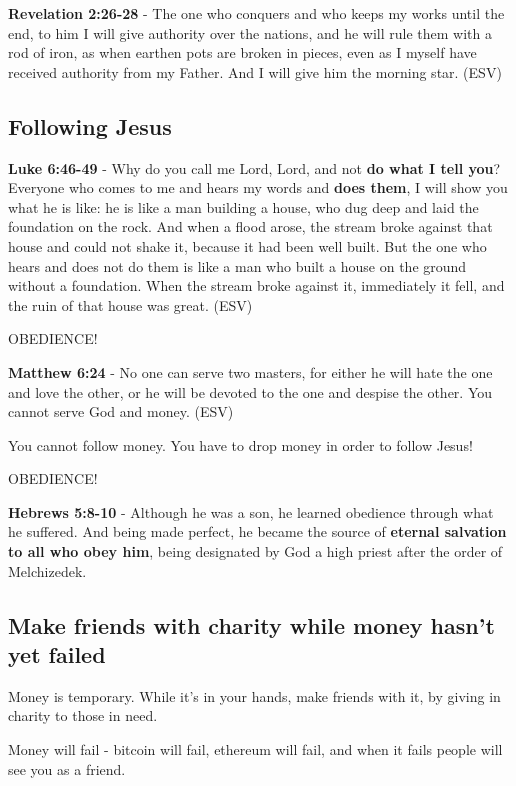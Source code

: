 \documentclass[11pt]{article}
\begin{document}
\textbf{Revelation 2:26-28} - The one who conquers and who keeps my works until the end, to him I will give authority over the nations, and he will rule them with a rod of iron, as when earthen pots are broken in pieces, even as I myself have received authority from my Father. And I will give him the morning star. (ESV)

\subsection{Following Jesus}
\label{sec:org641cdb5}
\textbf{Luke 6:46-49} - Why do you call me Lord, Lord, and not \textbf{do what I tell you}? Everyone who comes to me and hears my words and \textbf{does them}, I will show you what he is like: he is like a man building a house, who dug deep and laid the foundation on the rock. And when a flood arose, the stream broke against that house and could not shake it, because it had been well built. But the one who hears and does not do them is like a man who built a house on the ground without a foundation. When the stream broke against it, immediately it fell, and the ruin of that house was great. (ESV)

OBEDIENCE!

\textbf{Matthew 6:24} - No one can serve two masters, for either he will hate the one and love the other, or he will be devoted to the one and despise the other. You cannot serve God and money. (ESV)

You cannot follow money. You have to drop money in order to follow Jesus!

OBEDIENCE!

\textbf{Hebrews 5:8-10} - Although he was a son, he learned obedience through what he suffered. And being made perfect, he became the source of \textbf{eternal salvation to all who obey him}, being designated by God a high priest after the order of Melchizedek.

\subsection{Make friends with charity while money hasn't yet failed}
\label{sec:orgde93399}
Money is temporary. While it's in your hands, make friends with it, by giving in charity to those in need.

Money will fail - bitcoin will fail, ethereum will fail, and when it fails people will see you as a friend.
\end{document}
